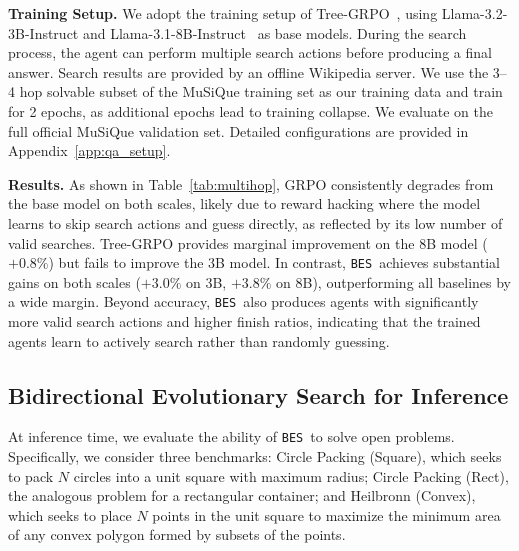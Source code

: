 \documentclass{llmxive}
\providecommand{\ours}{\texttt{BES}}
\begin{document}
\textbf{Training Setup.} We adopt the training setup of Tree-GRPO~\citep{treegrpo}, using Llama-3.2-3B-Instruct and Llama-3.1-8B-Instruct~\citep{llama3} as base models. During the search process, the agent can perform multiple search actions before producing a final answer. Search results are provided by an offline Wikipedia server. We use the 3--4 hop solvable subset of the MuSiQue training set as our training data and train for 2 epochs, as additional epochs lead to training collapse. We evaluate on the full official MuSiQue validation set. Detailed configurations are provided in Appendix~\ref{app:qa_setup}.

\textbf{Results.} As shown in Table~\ref{tab:multihop}, GRPO consistently degrades from the base model on both scales, likely due to reward hacking where the model learns to skip search actions and guess directly, as reflected by its low number of valid searches. Tree-GRPO provides marginal improvement on the 8B model ($+0.8\%$) but fails to improve the 3B model. In contrast, \ours\ achieves substantial gains on both scales ($+3.0\%$ on 3B, $+3.8\%$ on 8B), outperforming all baselines by a wide margin. Beyond accuracy, \ours\ also produces agents with significantly more valid search actions and higher finish ratios, indicating that the trained agents learn to actively search rather than randomly guessing.



\subsection{Bidirectional Evolutionary Search for Inference}
At inference time, we evaluate the ability of \ours\ to solve open problems. Specifically, we consider three benchmarks: Circle Packing (Square), which seeks to pack $N$ circles into a unit square with maximum radius; Circle Packing (Rect), the analogous problem for a rectangular container; and Heilbronn (Convex), which seeks to place $N$ points in the unit square to maximize the minimum area of any convex polygon formed by subsets of the points.
\end{document}
